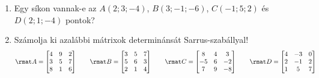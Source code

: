 \documentclass[a4paper, 12pt]{scrartcl}
\begin{document}
\begin{enumerate}
  \item Egy síkon vannak-e az $A(2; 3; -4)$, $B(3; -1; -6)$, $C(-1; 5; 2)$ és
        $D(2; 1; -4)$ pontok?

  \item Számolja ki azalábbi mátrixok determinánsát Sarrus-szabállyal!
        $$
          \rmat A =
          \begin{bmatrix}
            4 & 9 & 2 \\
            3 & 5 & 7 \\
            8 & 1 & 6
          \end{bmatrix}
          \qquad
          \rmat B =
          \begin{bmatrix}
            3 & 5 & 7 \\
            5 & 6 & 3 \\
            2 & 1 & 4
          \end{bmatrix}
          \qquad
          \rmat C =
          \begin{bmatrix}
            8  & 4 & 3  \\
            -5 & 6 & -2 \\
            7  & 9 & -8
          \end{bmatrix}
          \qquad
          \rmat D =
          \begin{bmatrix}
            4 & -3 & 0 \\
            2 & -1 & 2 \\
            1 & 5  & 7
          \end{bmatrix}
        $$


\end{enumerate}
\end{document}
